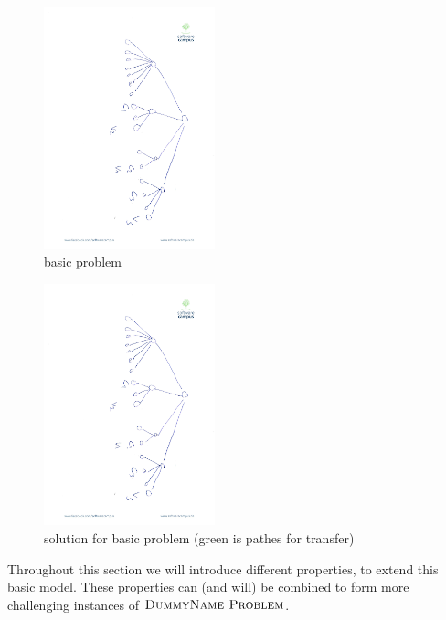 \begin{figure}
 
\includegraphics[angle=90,origin=c, height=7cm]{figs/model_fig_skteches/basic_problem}
\caption{basic problem}
\end{figure}
\begin{figure}
 
\includegraphics[angle=90,origin=c, height=7cm]{figs/model_fig_skteches/basic_problem}
\caption{solution for basic problem (green is pathes for transfer)}
\end{figure}

Throughout this section we will introduce different properties, to extend this 
basic model. These properties can (and will) be combined to form more 
challenging instances of $\textsc{DummyName Problem}$.

